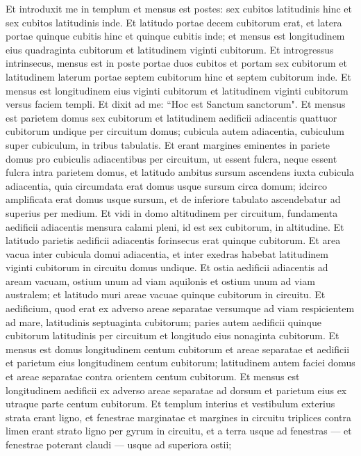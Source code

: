 \begin{biblechapter}  
\verse Et introduxit me in templum et mensus est postes: sex cubitos latitudinis hinc et sex cubitos latitudinis inde. 
\verse Et latitudo portae decem cubitorum erat, et latera portae quinque cubitis hinc et quinque cubitis inde; et mensus est longitudinem eius quadraginta cubitorum et latitudinem viginti cubitorum. 
\verse Et introgressus intrinsecus, mensus est in poste portae duos cubitos et portam sex cubitorum et latitudinem laterum portae septem cubitorum hinc et septem cubitorum inde. 
\verse Et mensus est longitudinem eius viginti cubitorum et latitudinem viginti cubitorum versus faciem templi. Et dixit ad me: “Hoc est Sanctum sanctorum". 
\verse Et mensus est parietem domus sex cubitorum et latitudinem aedificii adiacentis quattuor cubitorum undique per circuitum domus; 
\verse cubicula autem adiacentia, cubiculum super cubiculum, in tribus tabulatis. Et erant margines eminentes in pariete domus pro cubiculis adiacentibus per circuitum, ut essent fulcra, neque essent fulcra intra parietem domus, 
\verse et latitudo ambitus sursum ascendens iuxta cubicula adiacentia, quia circumdata erat domus usque sursum circa domum; idcirco amplificata erat domus usque sursum, et de inferiore tabulato ascendebatur ad superius per medium. 
\verse Et vidi in domo altitudinem per circuitum, fundamenta aedificii adiacentis mensura calami pleni, id est sex cubitorum, in altitudine. 
\verse Et latitudo parietis aedificii adiacentis forinsecus erat quinque cubitorum. Et area vacua inter cubicula domui adiacentia, 
\verse et inter exedras habebat latitudinem viginti cubitorum in circuitu domus undique. 
\verse Et ostia aedificii adiacentis ad aream vacuam, ostium unum ad viam aquilonis et ostium unum ad viam australem; et latitudo muri areae vacuae quinque cubitorum in circuitu. 
\verse Et aedificium, quod erat ex adverso areae separatae versumque ad viam respicientem ad mare, latitudinis septuaginta cubitorum; paries autem aedificii quinque cubitorum latitudinis per circuitum et longitudo eius nonaginta cubitorum. 
\verse Et mensus est domus longitudinem centum cubitorum et areae separatae et aedificii et parietum eius longitudinem centum cubitorum; 
\verse latitudinem autem faciei domus et areae separatae contra orientem centum cubitorum. 
\verse Et mensus est longitudinem aedificii ex adverso areae separatae ad dorsum et parietum eius ex utraque parte centum cubitorum. Et templum interius et vestibulum exterius 
\verse strata erant ligno, et fenestrae marginatae et margines in circuitu triplices contra limen erant strato ligno per gyrum in circuitu, et a terra usque ad fenestras — et fenestrae poterant claudi — usque ad superiora ostii; 

\end{biblechapter}
